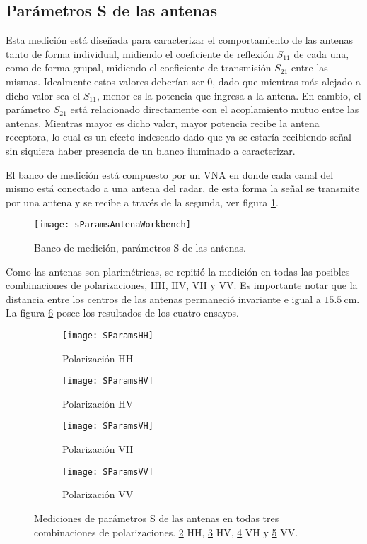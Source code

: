 \subsection{Parámetros S de las antenas} \label{ssc:sParameters}

Esta medición está diseñada para caracterizar el comportamiento de las antenas tanto de forma individual, midiendo el coeficiente de reflexión $S_{11}$ de cada una, como de forma grupal, midiendo el coeficiente de transmisión $S_{21}$ entre las mismas. Idealmente estos valores deberían ser 0, dado que mientras más alejado a dicho valor sea el $S_{11}$, menor es la potencia que ingresa a la antena. En cambio, el parámetro $S_{21}$ está relacionado directamente con el acoplamiento mutuo entre las antenas. Mientras mayor es dicho valor, mayor potencia recibe la antena receptora, lo cual es un efecto indeseado dado que ya se estaría recibiendo señal sin siquiera haber presencia de un blanco iluminado a caracterizar.

El banco de medición está compuesto por un VNA en donde cada canal del mismo está conectado a una antena del radar, de esta forma  la señal se transmite por una antena y se recibe a través de la segunda, ver figura \ref{fig:sParamsConnections}.
\begin{figure}[H]
 \centering
 \texttt{[image: sParamsAntenaWorkbench]}
 \caption{Banco de medición, parámetros S de las antenas.}
 \label{fig:sParamsConnections}
\end{figure}

Como las antenas son plarimétricas, se repitió la medición en todas las posibles combinaciones de polarizaciones, HH, HV, VH y VV. Es importante notar que la distancia entre los centros de las antenas permaneció invariante e igual a $\SI{15.5}{\centi\meter}$. La figura \ref{fig:sParametersMeasurements} posee los resultados de los cuatro ensayos.

\begin{figure}[H]
  \centering
  \begin{subfigure}{0.47\textwidth}
    \centering
    \texttt{[image: SParamsHH]}
    \caption{Polarización HH}
    \label{subfig:hhPol}
  \end{subfigure}
  \begin{subfigure}{0.47\textwidth}
    \centering
    \texttt{[image: SParamsHV]}
    \caption{Polarización HV}
    \label{subfig:hvPol}
  \end{subfigure}

  \begin{subfigure}{0.47\textwidth}
    \centering
    \texttt{[image: SParamsVH]}
    \caption{Polarización VH}
    \label{subfig:vhPol}
  \end{subfigure}
  \begin{subfigure}{0.47\textwidth}
    \centering
    \texttt{[image: SParamsVV]}
    \caption{Polarización VV}
    \label{subfig:vvPol}
  \end{subfigure}
  \caption{Mediciones de parámetros S de las antenas en todas tres combinaciones de polarizaciones. \ref{subfig:hhPol} HH, \ref{subfig:hvPol} HV, \ref{subfig:vhPol} VH y \ref{subfig:vvPol} VV.}
  \label{fig:sParametersMeasurements}
\end{figure}

